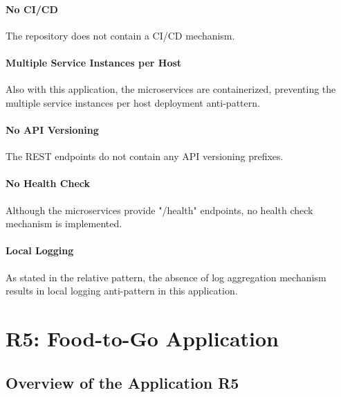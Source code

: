 \documentclass{Configuration_Files/PoliMi3i_thesis}
\begin{document}
\paragraph{No CI/CD} The repository does not contain a CI/CD mechanism.

\paragraph{Multiple Service Instances per Host} Also with this application, the microservices are containerized, preventing the multiple service instances per host deployment anti-pattern.

\paragraph{No API Versioning} The REST endpoints do not contain any API versioning prefixes.

\paragraph{No Health Check} Although the microservices provide "/health" endpoints, no health check mechanism is implemented.

\paragraph{Local Logging} As stated in the relative pattern, the absence of log aggregation mechanism results in local logging anti-pattern in this application.

\section{R5: Food-to-Go Application}
\label{sec:R5}

\subsection{Overview of the Application R5}
\label{subsec:R5_overview}
\end{document}

